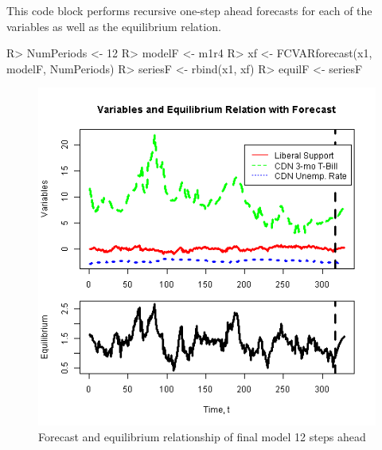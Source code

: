 \documentclass[article]{jss}
\begin{document}
This code block 
performs recursive one-step ahead forecasts for each of the variables as well as the equilibrium relation. 
%
%
\begin{Code}
R> NumPeriods <- 12
R> modelF <- m1r4
R> xf <- FCVARforecast(x1, modelF, NumPeriods)
R> seriesF <- rbind(x1, xf) 
R> equilF <- seriesF %
\end{Code}
%
%
%


\begin{figure}[H]
  \centering
  \includegraphics[scale = 1, keepaspectratio=true]{Figures/forecast_vars_eqbm.png}
  \caption{Forecast and equilibrium relationship of final model 12 steps ahead}
  \label{fig:forecast}
\end{figure}
\end{document}
